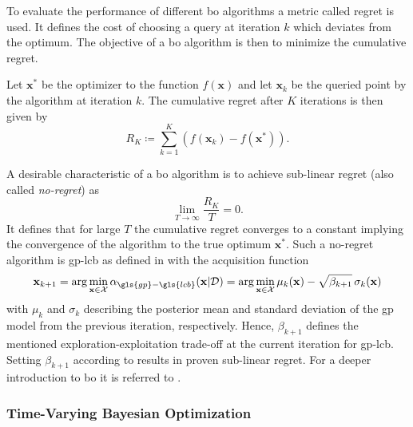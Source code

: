 To evaluate the performance of different \gls{bo} algorithms a metric called regret is used. It defines the cost of choosing a query at iteration $k$ which deviates from the optimum. The objective of a \gls{bo} algorithm is then to minimize the cumulative regret.
\begin{definition}
Let $\mathbf{x}^*$ be the optimizer to the function $f(\mathbf{x})$ and let $\mathbf{x}_k$ be the queried point by the algorithm at iteration $k$. The cumulative regret after $K$ iterations is then given by
\begin{equation}
    R_K \coloneqq \sum_{k=1}^K (f(\mathbf{x}_k) - f(\mathbf{x}^*)).
\end{equation}
\end{definition}
A desirable characteristic of a \gls{bo} algorithm is to achieve sub-linear regret (also called \emph{no-regret}) as
\begin{equation}
    \lim_{T \to \infty} \frac{R_K}{T} = 0.
\end{equation}
It defines that for large $T$ the cumulative regret converges to a constant implying the convergence of the algorithm to the true optimum $\mathbf{x}^*$.
Such a no-regret algorithm is \gls{gp}-\gls{lcb} as defined in \cite{Srinivas_2010} with the acquisition function
\begin{equation}
    \mathbf{x}_{k+1} = \argmin_{\mathbf{x} \in \mathcal{X}} \alpha_{\gls{gp}-\gls{lcb}}(\mathbf{x}|\mathcal{D}) = \argmin_{\mathbf{x} \in \mathcal{X}} \mu_k(\mathbf{x}) - \sqrt{\beta_{k+1}}\, \sigma_k(\mathbf{x})
    \label{eq:lcb}
\end{equation}
with $\mu_k$ and $\sigma_k$ describing the posterior mean and standard deviation of the \gls{gp} model from the previous iteration, respectively. Hence, $\beta_{k+1}$ defines the mentioned exploration-exploitation trade-off at the current iteration for \gls{gp}-\gls{lcb}. Setting $\beta_{k+1}$ according to \textcite[Theorem 1]{Srinivas_2010} results in proven sub-linear regret. For a deeper introduction to \gls{bo} it is referred to \textcite{Shahriari_2016}.

\subsubsection{Time-Varying Bayesian Optimization}
\label{sec:tvbo}

